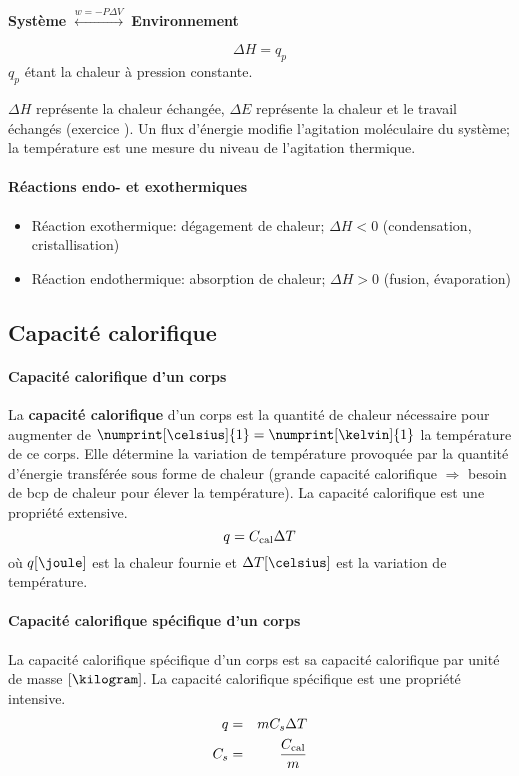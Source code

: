 \textbf{Système} $\stackrel{w=-P\Delta V}{\longleftrightarrow}$ \textbf{Environnement}

$$\Delta H=q_p$$ $q_p$ étant la chaleur à pression constante.

$\Delta H$ représente la chaleur échangée, $\Delta E$ représente la chaleur et le travail échangés (exercice \cite[p.~10]{legras}).
Un flux d'énergie modifie l'agitation moléculaire du système; la température est une mesure du niveau de l'agitation thermique.

\paragraph{Réactions endo- et exothermiques}
\begin{itemize}
\item Réaction exothermique: dégagement de chaleur; $\Delta H<0$ (condensation, cristallisation)
\item Réaction endothermique: absorption de chaleur; $\Delta H>0$ (fusion, évaporation)
\end{itemize}

\subsection{Capacité calorifique}
\paragraph{Capacité calorifique d'un corps} \label{sec:C_cal}
La \textbf{capacité calorifique} d'un corps est la quantité de chaleur nécessaire pour augmenter de $\numprint[\celsius]{1} = \numprint[\kelvin]{1}$ la température de ce corps.
Elle détermine la variation de température provoquée par la quantité d'énergie transférée sous forme de chaleur (grande capacité calorifique $\Rightarrow$ besoin de bcp de chaleur pour élever la température).
La capacité calorifique est une propriété extensive.
\[ q = C_\mathrm{cal} \Delta T \]
où $q[\joule]$ est la chaleur fournie et $\Delta T[\celsius]$ est la variation de température.

\paragraph{Capacité calorifique spécifique d'un corps} \label{sec:C_s}
La capacité calorifique spécifique d'un corps est sa capacité calorifique par unité de masse $[\kilogram]$.
La capacité calorifique spécifique est une propriété intensive.
\begin{eqnarray*}
	q &=& m C_s \Delta T\\
	C_s &=& \frac{C_\mathrm{cal}}{m}
\end{eqnarray*}

